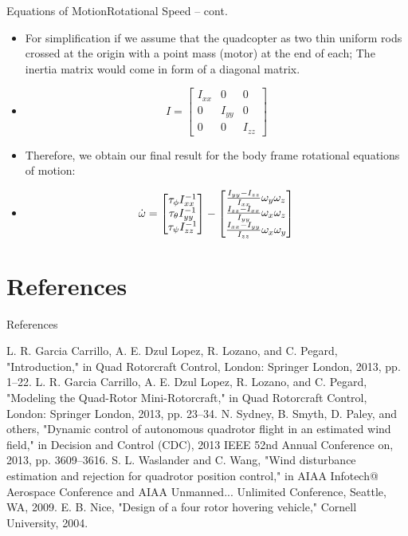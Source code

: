 \documentclass[8pt]{beamer}
\renewcommand{\|}[1][.3em]{\hspace{#1}|\hspace{#1}}
\renewcommand{\,}[1][.3em]{,\hspace{#1}}
\begin{document}
\begin{frame}{Equations of Motion}{Rotational Speed -- cont.}
    \begin{itemize}%
    \item For simplification if we assume that the quadcopter as two thin uniform rods crossed at the origin with a point mass (motor) at the end of each; The inertia matrix would come in form of a diagonal matrix.
    \item[] \begin{equation}
    I = \begin{bmatrix}
    I_{xx}&0&0\\
    0&I_{yy}&0\\
    0&0&I_{zz}
    \end{bmatrix}
    \end{equation}
    \item Therefore, we obtain our final result for the body frame rotational equations of motion:
    \item[] \begin{equation}
    \dot{\omega} = \begin{bmatrix}
    \tau_{\phi}I_{xx}^{-1}\\
    \tau_{\theta}I_{yy}^{-1}\\
    \tau_{\psi}I_{zz}^{-1}
    \end{bmatrix} - \begin{bmatrix}
    {{I_{yy} - I_{zz}} \over I_{xx}}\omega_y\omega_z\\
    {{I_{zz} - I_{xx}} \over I_{yy}}\omega_x\omega_z\\
    {{I_{xx} - I_{yy}} \over I_{zz}}\omega_x\omega_y
    \end{bmatrix}
    \end{equation}
    \end{itemize}
\end{frame}
\section{References}
\begin{frame}{References}
    \nocite{*}
    {\scriptsize
    \begin{thebibliography}{1}
    \bibitem{}
    L. R. Garcia Carrillo, A. E. Dzul Lopez, R. Lozano, and C. Pegard, "Introduction," in Quad Rotorcraft Control, London: Springer London, 2013, pp. 1–22.
    \bibitem{}
    L. R. Garcia Carrillo, A. E. Dzul Lopez, R. Lozano, and C. Pegard, "Modeling the Quad-Rotor Mini-Rotorcraft," in Quad Rotorcraft Control, London: Springer London, 2013, pp. 23–34.
    \bibitem{}
    N. Sydney, B. Smyth, D. Paley, and others, "Dynamic control of autonomous quadrotor flight in an estimated wind field," in Decision and Control (CDC), 2013 IEEE 52nd Annual Conference on, 2013, pp. 3609–3616.
    \bibitem{}
    S. L. Waslander and C. Wang, "Wind disturbance estimation and rejection for quadrotor position control," in AIAA Infotech@ Aerospace Conference and AIAA Unmanned... Unlimited Conference, Seattle, WA, 2009.
    \bibitem{}
    E. B. Nice, "Design of a four rotor hovering vehicle," Cornell University, 2004.
    \end{thebibliography}
    }
\end{frame}

\appendix
\end{document}
